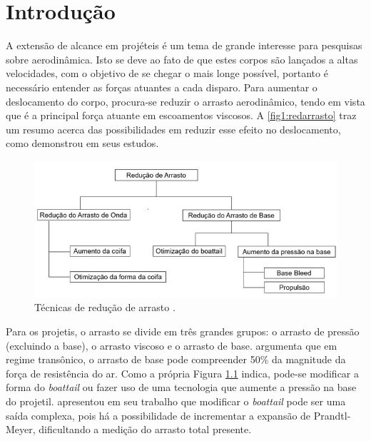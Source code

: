 \chapter{Introdução}
\graphicspath{{chapter-01/img-cap01/}}

A extensão de alcance em projéteis é um tema de grande interesse para pesquisas sobre aerodinâmica. Isto se deve ao fato de que estes corpos são lançados a altas velocidades, com o objetivo de se chegar o mais longe possível, portanto é necessário entender as forças atuantes a cada disparo. Para aumentar o deslocamento do corpo, procura-se reduzir o arrasto aerodinâmico, tendo em vista que é a principal força atuante em escoamentos viscosos. A \autoref{fig1:redarrasto} traz um resumo acerca das possibilidades em reduzir esse efeito no deslocamento, como \citeauthor{Dali2018a} demonstrou em seus estudos.

\begin{figure}[!ht]
	\centering
	\includegraphics[width=1.0\textwidth]{foto01-reducao-arrasto.png}
	\caption[Técnicas de redução de arrasto, traduzido e adaptado.]{Técnicas de redução de arrasto \cite{Dali2018a}.}
	\label{fig1:redarrasto}
\end{figure}

Para os projetis, o arrasto se divide em três grandes grupos: o arrasto de pressão (excluindo a base), o arrasto viscoso e o arrasto de base. \citeauthor{Sahu1985} argumenta que em regime transônico, o arrasto de base pode compreender 50\% da magnitude da força de resistência do ar. Como a própria Figura \ref{fig1:redarrasto} indica, pode-se modificar a forma do \textit{boattail} ou fazer uso de uma tecnologia que aumente a pressão na base do projetil. \citeauthor{Sedney1966} apresentou em seu trabalho que modificar o \textit{boattail} pode ser uma saída complexa, pois há a possibilidade de incrementar a expansão de Prandtl-Meyer, dificultando a medição do arrasto total presente.

